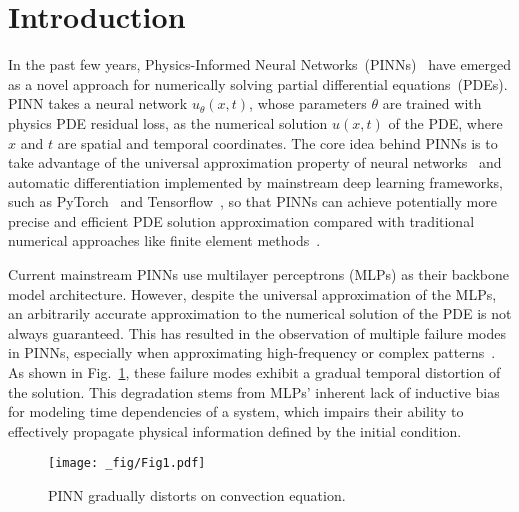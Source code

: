 \section{Introduction}

In the past few years, Physics-Informed Neural Networks~(PINNs)~\cite{raissi2019physics} have emerged as a novel approach for numerically solving partial differential equations~(PDEs). PINN takes a neural network $u_{\theta}(x,t)$, whose parameters $\theta$ are trained with physics PDE residual loss, as the numerical solution $u(x,t)$ of the PDE, where $x$ and $t$ are spatial and temporal coordinates. The core idea behind PINNs is to take advantage of the universal approximation property of neural networks~\cite{hornik1989multilayer} and automatic differentiation implemented by mainstream deep learning frameworks, such as PyTorch~\cite{paszke2019pytorch} and Tensorflow~\cite{abadi2016tensorflow}, so that PINNs can achieve potentially more precise and efficient PDE solution approximation compared with traditional numerical approaches like finite element methods~\cite{reddy1993introduction}.

Current mainstream PINNs use multilayer perceptrons (MLPs) as their backbone model architecture. However, despite the universal approximation of the MLPs, an arbitrarily accurate approximation to the numerical solution of the PDE is not always guaranteed. This has resulted in the observation of multiple failure modes in PINNs, especially when approximating high-frequency or complex patterns~\cite{krishnapriyan2021characterizing}. As shown in Fig.~\ref{fig1}, these failure modes exhibit a gradual temporal distortion of the solution. This degradation stems from MLPs' inherent lack of inductive bias for modeling time dependencies of a system, which impairs their ability to effectively propagate physical information defined by the initial condition.


\begin{figure}[t!]
    \centering
    \texttt{[image: \_fig/Fig1.pdf]}
    \vspace{-2mm}
    \caption{PINN gradually distorts on convection equation.}
    \label{fig1}
    \vspace{-5mm}
\end{figure}


